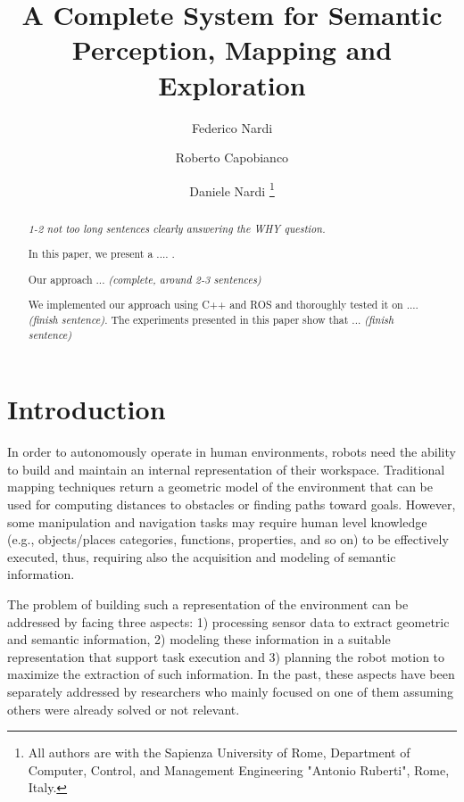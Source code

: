 \documentclass[letterpaper, 10 pt, conference]{ieeeconf}  %
\title{\LARGE \bf A Complete System for Semantic Perception, Mapping and Exploration}
\author{Federico Nardi \and Roberto Capobianco \and Daniele Nardi%
  \thanks{All authors are with the Sapienza University of Rome, 
  Department of Computer, Control, and Management Engineering  "Antonio Ruberti", Rome, Italy. }%
}
\begin{document}
\maketitle
\thispagestyle{empty}
\pagestyle{empty}


\begin{abstract}
  \emph{1-2 not too long sentences clearly answering the WHY question.}
  
  In this paper, we present a ....  . 

  Our approach ... \emph{(complete, around 2-3 sentences)}
 
  We implemented our approach using C++ and ROS and thoroughly tested
  it on .... \emph{(finish sentence)}. The experiments presented in
  this paper show that ... \emph{(finish sentence)}
\end{abstract}


\section{Introduction}
\label{sec:intro}

In order to autonomously operate in human environments, robots need the ability to build and maintain an internal representation of their workspace. Traditional mapping techniques return a geometric model of the environment that can be used for computing distances to obstacles or finding paths toward goals. However, some manipulation and navigation tasks may require human level knowledge (e.g., objects/places categories, functions, properties, and so on) to be effectively executed, thus, requiring also the acquisition and modeling of semantic information.


The problem of building such a representation of the environment can be addressed by facing three aspects: 1) processing sensor data to extract geometric and semantic information, 2) modeling these information in a suitable representation that support task execution and 3) planning the robot motion to maximize the extraction of such information. In the past, these aspects have been separately addressed by researchers who mainly focused on one of them assuming others were already solved or not relevant.
\end{document}
